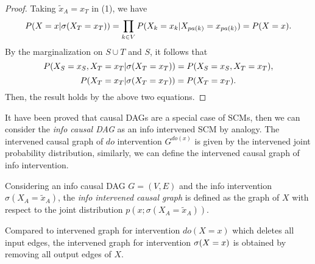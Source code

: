 \begin{proof}
	Taking $\tilde{x}_{A}=x_{T}$ in (1), we have 
	$$
	P(X=x|\mathrm{\sigma}(X_T=x_T)) = \prod_{k\in V} P(X_k = x_k|X_{pa(k)} = x_{pa(k)})=P(X=x).
	$$
	By the marginalization on $S \cup T$ and $S$, it follows that 
	$$
	P(X_S=x_S, X_T = {x}_T|\mathrm{\sigma}(X_T={x}_T)) = P(X_S=x_S, X_T = {x}_T), 
	$$
	$$
	P( X_T = {x}_T|\mathrm{\sigma}(X_T={x}_T)) = P(X_T = {x}_T).
	$$ 
   Then, the result holds by the above two equations.
\end{proof}


It have been proved that causal DAGs are a special case of SCMs, then we can consider the \emph{info causal DAG} as an info intervened SCM {{by analogy}}. The intervened causal graph of $do$ intervention $G^{do(x)}$ is given by the intervened joint probability distribution, similarly, we can define the intervened causal graph of info intervention. 

\begin{Def}
	Considering an info causal DAG $G = (V, E)$ and the info intervention $\sigma(X_A = \tilde{x}_A)$, the \emph{info intervened causal graph} is defined as the graph of $X$ with respect to the joint distribution $p(x; \sigma(X_A=\tilde{x}_A))$.
\end{Def}

Compared to intervened graph for intervention $do(X=x)$ which deletes all input edges, the intervened graph for intervention $\mathrm{\sigma}(X=x)$ is obtained by removing all output edges of $X$.




